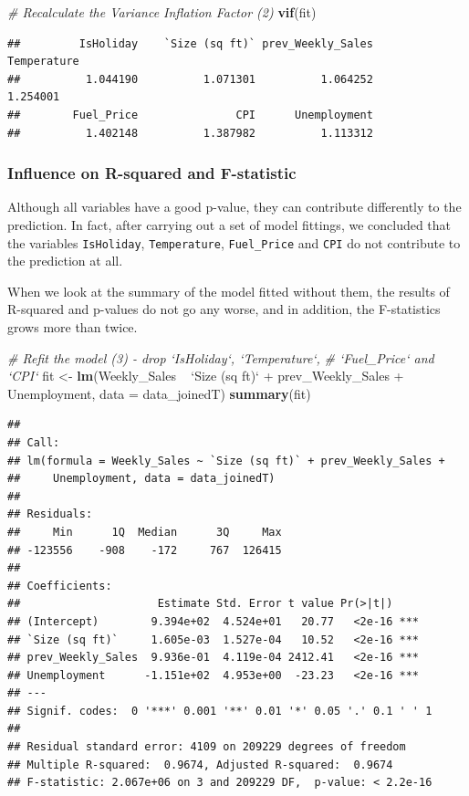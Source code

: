 \documentclass[11pt,]{article}
\newenvironment{Shaded}{\begin{snugshade}}{\end{snugshade}}
\newcommand{\KeywordTok}[1]{\textcolor[rgb]{0.13,0.29,0.53}{\textbf{{#1}}}}
\newcommand{\DataTypeTok}[1]{\textcolor[rgb]{0.13,0.29,0.53}{{#1}}}
\newcommand{\StringTok}[1]{\textcolor[rgb]{0.31,0.60,0.02}{{#1}}}
\newcommand{\CommentTok}[1]{\textcolor[rgb]{0.56,0.35,0.01}{\textit{{#1}}}}
\newcommand{\NormalTok}[1]{{#1}}
\begin{document}
\begin{Shaded}
\begin{Highlighting}[]
\CommentTok{# Recalculate the Variance Inflation Factor (2)}
\KeywordTok{vif}\NormalTok{(fit)}
\end{Highlighting}
\end{Shaded}

\begin{verbatim}
##         IsHoliday    `Size (sq ft)` prev_Weekly_Sales       Temperature 
##          1.044190          1.071301          1.064252          1.254001 
##        Fuel_Price               CPI      Unemployment 
##          1.402148          1.387982          1.113312
\end{verbatim}

\pagebreak

\subsubsection{Influence on R-squared and
F-statistic}\label{influence-on-r-squared-and-f-statistic}

Although all variables have a good p-value, they can contribute
differently to the prediction. In fact, after carrying out a set of
model fittings, we concluded that the variables \texttt{IsHoliday},
\texttt{Temperature}, \texttt{Fuel\_Price} and \texttt{CPI} do not
contribute to the prediction at all.

When we look at the summary of the model fitted without them, the
results of R-squared and p-values do not go any worse, and in addition,
the F-statistics grows more than twice.

\begin{Shaded}
\begin{Highlighting}[]
\CommentTok{# Refit the model (3) - drop `IsHoliday`, `Temperature`,}
\CommentTok{# `Fuel_Price` and `CPI`}
\NormalTok{fit <-}\StringTok{ }\KeywordTok{lm}\NormalTok{(Weekly_Sales ~}\StringTok{ `}\DataTypeTok{Size (sq ft)}\StringTok{`} \NormalTok{+}\StringTok{ }\NormalTok{prev_Weekly_Sales +}\StringTok{ }
\StringTok{    }\NormalTok{Unemployment, }\DataTypeTok{data =} \NormalTok{data_joinedT)}
\KeywordTok{summary}\NormalTok{(fit)}
\end{Highlighting}
\end{Shaded}

\begin{verbatim}
## 
## Call:
## lm(formula = Weekly_Sales ~ `Size (sq ft)` + prev_Weekly_Sales + 
##     Unemployment, data = data_joinedT)
## 
## Residuals:
##     Min      1Q  Median      3Q     Max 
## -123556    -908    -172     767  126415 
## 
## Coefficients:
##                     Estimate Std. Error t value Pr(>|t|)    
## (Intercept)        9.394e+02  4.524e+01   20.77   <2e-16 ***
## `Size (sq ft)`     1.605e-03  1.527e-04   10.52   <2e-16 ***
## prev_Weekly_Sales  9.936e-01  4.119e-04 2412.41   <2e-16 ***
## Unemployment      -1.151e+02  4.953e+00  -23.23   <2e-16 ***
## ---
## Signif. codes:  0 '***' 0.001 '**' 0.01 '*' 0.05 '.' 0.1 ' ' 1
## 
## Residual standard error: 4109 on 209229 degrees of freedom
## Multiple R-squared:  0.9674, Adjusted R-squared:  0.9674 
## F-statistic: 2.067e+06 on 3 and 209229 DF,  p-value: < 2.2e-16
\end{verbatim}
\end{document}
